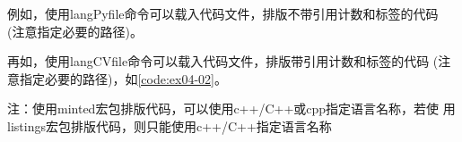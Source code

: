\documentclass[
  ]{nwafuprojrep}
\begin{document}
例如，使用langPyfile命令可以载入代码文件，排版不带引用计数和标签的代码
(注意指定必要的路径)。


再如，使用langCVfile命令可以载入代码文件，排版带引用计数和标签的代码
(注意指定必要的路径)，如\autoref{code:ex04-02}。


注：使用minted宏包排版代码，可以使用c++/C++或cpp指定语言名称，若使
用listings宏包排版代码，则只能使用c++/C++指定语言名称

\newpage
\printbibliography[heading=bibliography,title=参考文献]
\end{document}
